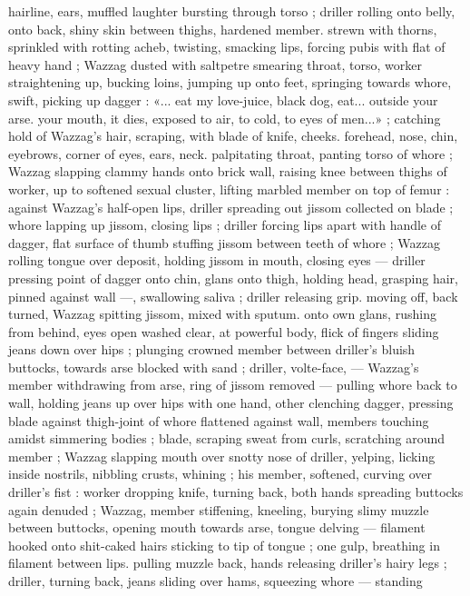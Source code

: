 hairline, ears, muffled laughter bursting through torso ; driller rolling
onto belly, onto back, shiny skin between thighs, hardened member.
strewn with thorns, sprinkled with rotting acheb, twisting, smacking
lips, forcing pubis with flat of heavy hand ; Wazzag dusted with
saltpetre smearing throat, torso, worker straightening up, bucking
loins, jumping up onto feet, springing towards whore, swift, picking
up dagger : «... eat my love-juice, black dog, eat... outside your arse.
your mouth, it dies, exposed to air, to cold, to eyes of men...» ;
catching hold of Wazzag's hair, scraping, with blade of knife, cheeks.
forehead, nose, chin, eyebrows, corner of eyes, ears, neck.
palpitating throat, panting torso of whore ; Wazzag slapping clammy
hands onto brick wall, raising knee between thighs of worker, up to
softened sexual cluster, lifting marbled member on top of femur :
against Wazzag's half-open lips, driller spreading out jissom
collected on blade ; whore lapping up jissom, closing lips ; driller
forcing lips apart with handle of dagger, flat surface of thumb
stuffing jissom between teeth of whore ; Wazzag rolling tongue over
deposit, holding jissom in mouth, closing eyes --- driller pressing
point of dagger onto chin, glans onto thigh, holding head, grasping
hair, pinned against wall ---, swallowing saliva ; driller releasing grip.
moving off, back turned, Wazzag spitting jissom, mixed with sputum.
onto own glans, rushing from behind, eyes open washed clear, at
powerful body, flick of fingers sliding jeans down over hips ; plunging
crowned member between driller's bluish buttocks, towards arse
blocked with sand ; driller, volte-face, --- Wazzag's member
withdrawing from arse, ring of jissom removed --- pulling whore back
to wall, holding jeans up over hips with one hand, other clenching
dagger, pressing blade against thigh-joint of whore flattened against
wall, members touching amidst simmering bodies ; blade, scraping
sweat from curls, scratching around member ; Wazzag slapping
mouth over snotty nose of driller, yelping, licking inside nostrils,
nibbling crusts, whining ; his member, softened, curving over driller's
fist : worker dropping knife, turning back, both hands spreading
buttocks again denuded ; Wazzag, member stiffening, kneeling,
burying slimy muzzle between buttocks, opening mouth towards
arse, tongue delving --- filament hooked onto shit-caked hairs
sticking to tip of tongue ; one gulp, breathing in filament between
lips. pulling muzzle back, hands releasing driller's hairy legs ; driller,
turning back, jeans sliding over hams, squeezing whore --- standing
